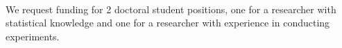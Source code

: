 
\notocsubsection{\pisg}

\begin{giprenv}

\end{giprenv}

\notocsubsection{\prsum}
\notocsubsubsection{\resqu}

\blindtext \textcite{teil1}

\notocsubsubsection{\state}

\blindtext \textcite{test3}

\notocsubsubsection{\respr}

\paragraph{\resprp}

\blindtext

\paragraph{\role}

\blindtext


\notocsubsection{\funds}

We request funding for 2 doctoral student positions, one for a
researcher with statistical knowledge and one for a researcher with
experience in conducting experiments.

